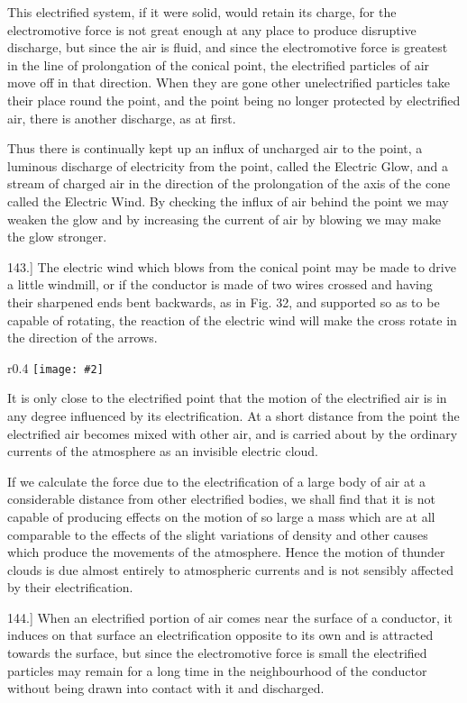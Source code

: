 \documentclass[12pt,oneside]{book}[2021/10/04]
\newcommand{\Runhead}[1]{\fancyhead[C]{\iffloatpage{}{\small#1}}}
\newcommand{\article}[1]{\phantomsection \label{art:#1}{#1.]}}
\newcommand{\wrapfig}[3]{
\begin{wrapfigure}{r}{#1\textwidth}
\centering
\texttt{[image: \#2]}
\caption*{\small #3}
\end{wrapfigure}}
\newcommand{\¬}{\hphantom{0}}
\begin{document}
This electrified system, if it were solid, would retain its charge,
for the electromotive force is not great enough at any place to
produce disruptive discharge, but since the air is fluid, and since
the electromotive force is greatest in the line of prolongation of
the conical point, the electrified particles of air move off in that
direction. When they are gone other unelectrified particles take
their place round the point, and the point being no longer
protected by electrified air, there is another discharge, as at first.

Thus there is continually kept up an influx of uncharged air
to the point, a luminous discharge of electricity from the point,
called the Electric Glow, and a stream of charged air in the
direction of the prolongation of the axis of the cone called the
Electric Wind. By checking the influx of air behind the point
we may weaken the glow and by increasing the current of air by
blowing we may make the glow stronger.

\article{143} The electric wind which blows from the conical point
may be made to drive a little windmill, or if the conductor is
made of two wires crossed and having their sharpened ends bent
backwards, as in Fig. 32, and supported so as to be capable of
rotating, the reaction of the electric
wind will make the cross rotate in
the direction of the arrows.
\Runhead{THE ELECTRIC WIND.}

\label{art:143a}
\wrapfig{0.4}{137.png}{Fig. 32.}
It is only close to the electrified
point that the motion of the electrified
air is in any degree influenced
by its electrification. At a short distance
from the point the electrified
air becomes mixed with other air, and
is carried about by the ordinary currents of the atmosphere as an
invisible electric cloud.

\label{art:143b}
If we calculate the force due to the electrification of a large
body of air at a considerable distance from other electrified bodies,
we shall find that it is not capable of producing effects on the
motion of so large a mass which are at all comparable to the
effects of the slight variations of density and other causes which
produce the movements of the atmosphere. Hence the motion of
thunder clouds is due almost entirely to atmospheric currents and
is not sensibly affected by their electrification.

\article{144} When an electrified portion of air comes near the surface
of a conductor, it induces on that surface an electrification opposite
to its own and is attracted towards the surface, but since the
electromotive force is small the electrified particles may remain for
a long time in the neighbourhood of the conductor without being
drawn into contact with it and discharged.
\end{document}
